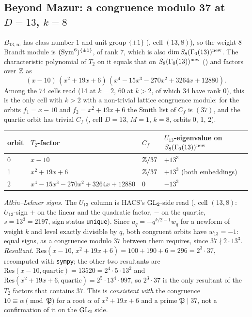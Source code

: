 \subsection{Beyond Mazur: a congruence modulo 37 at $D=13$, $k=8$}\label{ss:hacs-d13}
$B_{13,\infty}$ has class number $1$ and unit group $\{\pm1\}$ (, cell $(13,8)$), so the weight-8 Brandt
module is $(\mathrm{Sym}^6)^{\{\pm1\}}$, of rank 7, which is also $\dim S_8(\Gamma_0(13))^{\rm new}$. The characteristic polynomial of
$T_2$ on it equals that on $S_8(\Gamma_0(13))^{\rm new}$ () and factors over $\mathbb{Z}$ as
\[
(x-10)\,(x^2+19x+6)\,(x^4-15x^3-270x^2+3264x+12880).
\]
Among the 74 cells read (14 at $k=2$, 60 at $k>2$, of which 34 have rank $0$), this is the only cell with $k>2$ with a
non-trivial lattice congruence module: for the orbits $f_1=x-10$ and $f_2=x^2+19x+6$ the Smith list of $C_f$ is $(37)$,
and the quartic orbit has trivial $C_f$ (, cell $D=13$, $M=1$, $k=8$, orbits 0, 1, 2).
\begin{center}\small
\begin{tabular}{@{}llll@{}}\toprule
orbit & $T_2$-factor & $C_f$ & $U_{13}$-eigenvalue on $S_8(\Gamma_0(13))^{\rm new}$\\\midrule
0 & $x-10$ & $\mathbb{Z}/37$ & $+13^3$\\
1 & $x^2+19x+6$ & $\mathbb{Z}/37$ & $+13^3$ (both embeddings)\\
2 & $x^4-15x^3-270x^2+3264x+12880$ & $0$ & $-13^3$\\\bottomrule
\end{tabular}
\end{center}
\emph{Atkin--Lehner signs.} The $U_{13}$ column is HACS's $\mathrm{GL}_2$-side read (, cell $(13,8)$:
$U_{13}$-sign $+$ on the linear and the quadratic factor, $-$ on the quartic, $s=13^3=2197$, sign status
\texttt{unique}). Since $a_q=-q^{k/2-1}w_q$ for a newform of weight $k$ and level exactly divisible by $q$, both congruent
orbits have $w_{13}=-1$: equal signs, as a congruence modulo $37$ between them requires, since $37\nmid2\cdot13^3$.
\emph{Resultant.} $\mathrm{Res}(x-10,\,x^2+19x+6)=100+190+6=296=2^3\cdot37$, recomputed with \texttt{sympy}; the other two
resultants are $\mathrm{Res}(x-10,\text{quartic})=13520=2^4\cdot5\cdot13^2$ and
$\mathrm{Res}(x^2+19x+6,\text{quartic})=2^5\cdot13^4\cdot997$, so $2^3\cdot37$ is the only resultant of the $T_2$ factors
that contains $37$. This is \emph{consistent with} the congruence $10\equiv\alpha\pmod{\mathfrak P}$ for a root $\alpha$ of
$x^2+19x+6$ and a prime $\mathfrak P\mid37$, not a confirmation of it on the $\mathrm{GL}_2$ side.
